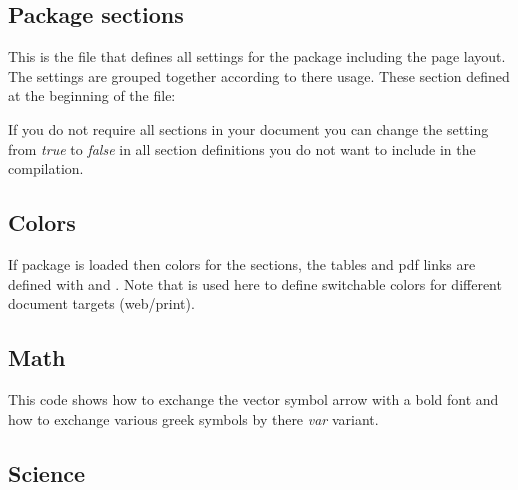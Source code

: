 \subsection{Package sections}
\label{sec:style:sections}

This is the file that defines all settings for the package including the page layout. The settings are grouped together according to there usage. 
These section defined at the beginning of the file:


If you do not require all sections in your document you can change the setting from \emph{true} to \emph{false} in all section definitions you do not want to include in the compilation.

\subsection{Colors}
\label{sec:style:colors}

If package  is loaded then colors for the sections, the tables and pdf links are defined with  and . Note that  is used here to define switchable colors for different document targets (web/print).


\subsection{Math}
\label{sec:style:math}

This code shows how to exchange the vector symbol arrow with a bold font and how to exchange various greek symbols by there \emph{var} variant.


\subsection{Science}
\label{sec:style:science}

